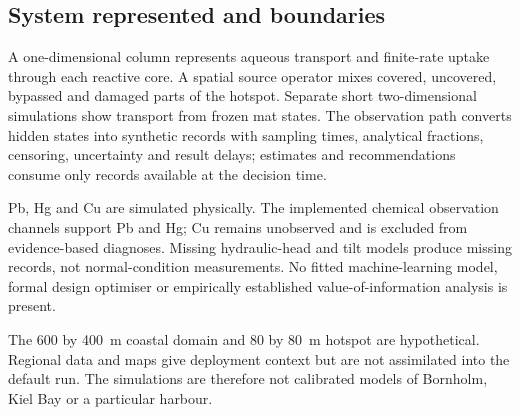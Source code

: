 \subsection{System represented and boundaries}
A one-dimensional column represents aqueous transport and finite-rate uptake through each reactive core. A spatial source operator mixes covered, uncovered, bypassed and damaged parts of the hotspot. Separate short two-dimensional simulations show transport from frozen mat states. The observation path converts hidden states into synthetic records with sampling times, analytical fractions, censoring, uncertainty and result delays; estimates and recommendations consume only records available at the decision time.

Pb, Hg and Cu are simulated physically. The implemented chemical observation channels support Pb and Hg; Cu remains unobserved and is excluded from evidence-based diagnoses. Missing hydraulic-head and tilt models produce missing records, not normal-condition measurements. No fitted machine-learning model, formal design optimiser or empirically established value-of-information analysis is present.

The 600 by 400~m coastal domain and 80 by 80~m hotspot are hypothetical. Regional data and maps give deployment context but are not assimilated into the default run. The simulations are therefore not calibrated models of Bornholm, Kiel Bay or a particular harbour.\par
